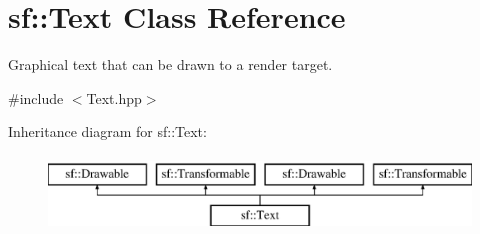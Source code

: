 \hypertarget{classsf_1_1_text}{\section{sf\-:\-:Text Class Reference}
\label{classsf_1_1_text}
}


Graphical text that can be drawn to a render target.  




{\ttfamily \#include $<$Text.\-hpp$>$}

Inheritance diagram for sf\-:\-:Text\-:\begin{figure}[H]
\begin{center}
\leavevmode
\includegraphics[height=2.000000cm]{classsf_1_1_text}
\end{center}
\end{figure}
